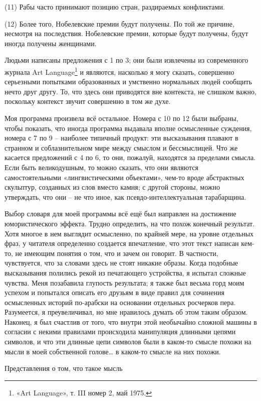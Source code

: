 \documentclass[../main.tex]{subfiles}
\begin{document}
(11) Рабы часто принимают позицию стран, раздираемых конфликтами.

(12) Более того, Нобелевские премии будут получены. По той же причине, несмотря на последствия. Нобелевские премии, которые будут получены, будут иногда получены женщинами.

Людьми написаны предложения с 1 по 3; они были извлечены из современного журнала Art Language\footnote{«Art Language», т. III номер 2, май 1975.} и являются, насколько я могу сказать, совершенно серьезными попытками образованных и умственно нормальных людей сообщить нечто друг другу. То, что здесь они приводятся вне контекста, не слишком важно, поскольку контекст звучит совершенно в том же духе.

Моя программа произвела всё остальное. Номера с 10 по 12 были выбраны, чтобы показать, что иногда программа выдавала вполне осмысленные суждения, номера с 7 по 9 \--- наиболее типичный продукт: эти высказывания плавают в странном и соблазнительном мире между смыслом и бессмыслицей. Что же касается предложений с 4 по 6, то они, пожалуй, находятся за пределами смысла. Если быть великодушным, то можно сказать, что они являются самостоятельными «лингвистическими объектами», чем-то вроде абстрактных скульптур, созданных из слов вместо камня; с другой стороны, можно утверждать, что они \--- не что иное, как псевдо-интеллектуальная тарабарщина.

Выбор словаря для моей программы всё ещё был направлен на достижение юмористического эффекта. Трудно определить, на что похож конечный результат. Хотя многое в нем выглядит осмысленно, по крайней мере, на уровне отдельных фраз, у читателя определенно создается впечатление, что этот текст написан кем-то, не имеющим понятия о том, что и зачем он говорит. В частности, чувствуется, что за словами здесь не стоят никакие образы. Когда подобные высказывания полились рекой из печатающего устройства, я испытал сложные чувства. Меня позабавила глупость результата; я также был весьма горд моим успехом и попытался описать его друзьям в виде правил для сочинения осмысленных историй по-арабски на основании отдельных росчерков пера. Разумеется, я преувеличивал, но мне нравилось думать об этом таким образом. Наконец, я был счастлив от того, что внутри этой необычайно сложной машины в согласии с некими правилами происходила манипуляция длинными цепями символов, и что эти длинные цепи символов были в каком-то смысле похожи на мысли в моей собственной голове\ldots{} в каком-то смысле на них похожи.

Представления о том, что такое мысль
\end{document}
